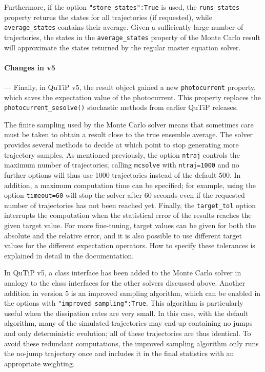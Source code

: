 \documentclass[preprint,3p,sort&compress]{elsarticle}
\def\code#1{\texttt{#1}}
\begin{document}
Furthermore, if the option \code{"store\_states":True} is used, the \code{runs\_states} property returns the states for all trajectories (if requested), while \code{average\_states} contains their average. Given a sufficiently large number of trajectories, the states in the \code{average\_states} property of the Monte Carlo result will approximate the states returned by the regular master equation solver.

\paragraph{Changes in v5} --- Finally, in QuTiP v5, the result object gained a new \code{photocurrent} property, which saves the expectation value of the photocurrent.
This property replaces the \code{photocurrent\_sesolve()} stochastic methods from earlier QuTiP releases.

The finite sampling used by the Monte Carlo solver means that sometimes care must be taken to obtain a result close to the true ensemble average. The solver provides several methods to decide at which point to stop generating more trajectory samples. As mentioned previously, the option \code{ntraj} controls the maximum number of trajectories; calling \code{mcsolve} with \code{ntraj=1000} and no further options will thus use 1000 trajectories instead of the default 500. In addition, a maximum computation time can be specified; for example, using the option \code{timeout=60} will stop the solver after 60 seconds even if the requested number of trajectories has not been reached yet. %
Finally, the \code{target\_tol} option interrupts the computation when the statistical error of the results %
reaches the given target value. For more fine-tuning, target values can be given for both the absolute and the relative error, and it is also possible to use different target values for the different expectation operators.
How to specify these tolerances is explained in detail in the documentation.

In QuTiP v5, a class interface has been added to the Monte Carlo solver in analogy to the class interfaces for the other solvers discussed above.
Another addition in version 5 is an improved sampling algorithm, which can be enabled in the options with \code{"improved\_sampling":True}. This algorithm is particularly useful when the dissipation rates are very small. In this case, with the default algorithm, many of the simulated trajectories may end up containing no jumps and only deterministic evolution; all of these trajectories are thus identical. To avoid these redundant computations, the improved sampling algorithm only runs the no-jump trajectory once and includes it in the final statistics with an appropriate weighting.
\end{document}
